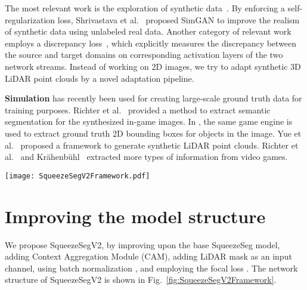 \documentclass[letterpaper, 10 pt, conference]{ieeeconf}
\begin{document}
The most relevant work is the exploration of synthetic data~\cite{shrivastava2017learning,zhang2017curriculum,hoffman2018cycada}. By enforcing a self-regularization loss, Shrivastava et al.~\cite{shrivastava2017learning} proposed SimGAN to improve the realism of synthetic data using unlabeled real data. Another category of relevant work employs a discrepancy loss~\cite{long2015learning,sun2017correlation,zhuo2017deep,morerio2018minimal}, which explicitly measures the discrepancy between the source and target domains on corresponding activation layers of the two network streams. Instead of working on 2D images, we try to adapt synthetic 3D LiDAR point clouds by a novel adaptation pipeline.

\textbf{Simulation} has recently been used for creating large-scale ground truth data for training purposes. Richter et al.~\cite{playingfordata} provided a method to extract semantic segmentation for the synthesized in-game images. In \cite{drivinginthematrix}, the same game engine is used to extract ground truth 2D bounding boxes for objects in the image. Yue et al.~\cite{yue2018lidar} proposed a framework to generate synthetic LiDAR point clouds. Richter et al.~\cite{playingforbenchmarks} and Kr\"ahenb\"uhl~\cite{philip2018free} extracted more types of information from video games. 

\begin{figure*}[!t]
\begin{center}
\centering \texttt{[image: SqueezeSegV2Framework.pdf]}
\caption{Network structure of the proposed SqueezeSegV2 model for road-object segmentation from 3D LiDAR point clouds.}
\label{fig:SqueezeSegV2Framework}
\end{center}
\end{figure*}

\section{Improving the model structure}
\label{sec:Better}

We propose SqueezeSegV2, by improving upon the base SqueezeSeg model, adding Context Aggregation Module (CAM), adding LiDAR mask as an input channel, using batch normalization \cite{ioffe2015batch}, and employing the focal loss \cite{lin2018focal}. The network structure of SqueezeSegV2 is shown in Fig.~\ref{fig:SqueezeSegV2Framework}.
\end{document}
